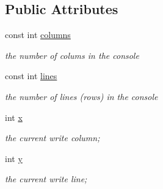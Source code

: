 \subsection*{Public Attributes}
\begin{DoxyCompactItemize}
\item 
const int \hyperlink{classhwlib_1_1console_a5dbe79428aadd15210029a76cb3d255d}{columns}\hypertarget{classhwlib_1_1console_a5dbe79428aadd15210029a76cb3d255d}{}\label{classhwlib_1_1console_a5dbe79428aadd15210029a76cb3d255d}

\begin{DoxyCompactList}\small\item\em the number of colums in the console \end{DoxyCompactList}\item 
const int \hyperlink{classhwlib_1_1console_a7c5ec25f5c780aaa56702778701ee270}{lines}\hypertarget{classhwlib_1_1console_a7c5ec25f5c780aaa56702778701ee270}{}\label{classhwlib_1_1console_a7c5ec25f5c780aaa56702778701ee270}

\begin{DoxyCompactList}\small\item\em the number of lines (rows) in the console \end{DoxyCompactList}\item 
int \hyperlink{classhwlib_1_1console_a609d3968c3bce1f52481f8a5b7536b42}{x}\hypertarget{classhwlib_1_1console_a609d3968c3bce1f52481f8a5b7536b42}{}\label{classhwlib_1_1console_a609d3968c3bce1f52481f8a5b7536b42}

\begin{DoxyCompactList}\small\item\em the current write column; \end{DoxyCompactList}\item 
int \hyperlink{classhwlib_1_1console_a809dbf940620fe1ef99725f596bf892a}{y}\hypertarget{classhwlib_1_1console_a809dbf940620fe1ef99725f596bf892a}{}\label{classhwlib_1_1console_a809dbf940620fe1ef99725f596bf892a}

\begin{DoxyCompactList}\small\item\em the current write line; \end{DoxyCompactList}\end{DoxyCompactItemize}
